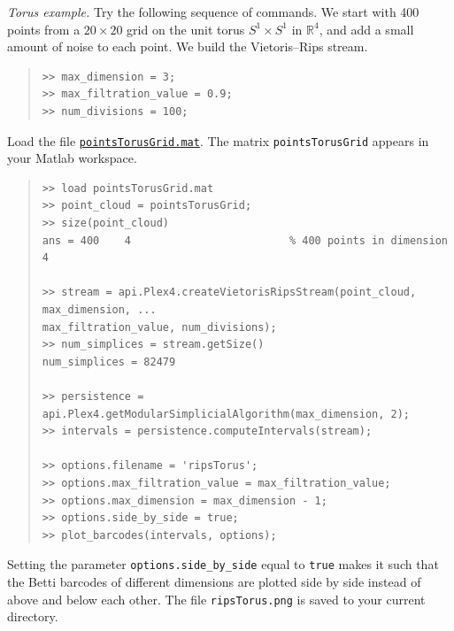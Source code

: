 \documentclass[amscd, amssymb, verbatim]{amsart}[12pt]
\theoremstyle{remark}
\theoremstyle{remark}
\theoremstyle{remark}
\begin{document}


{\em Torus example.} Try the following sequence of commands. We start with 400 points from a $20 \times 20$ grid on the unit torus $S^1 \times S^1$ in $\mathbb{R}^4$, and add a small amount of noise to each point.
We build the Vietoris--Rips stream.

\begin{quote} \begin{verbatim}
>> max_dimension = 3;
>> max_filtration_value = 0.9;
>> num_divisions = 100;
\end{verbatim} \end{quote}

Load the file \href{https://github.com/appliedtopology/javaplex/tree/master/src/matlab/for_distribution/tutorial_examples/pointsTorusGrid.mat}{\texttt{pointsTorusGrid.mat}}. The matrix \texttt{pointsTorusGrid} appears in your Matlab workspace.

\begin{quote} \begin{verbatim}
>> load pointsTorusGrid.mat
>> point_cloud = pointsTorusGrid;
>> size(point_cloud)
ans = 400    4                         % 400 points in dimension 4

>> stream = api.Plex4.createVietorisRipsStream(point_cloud, max_dimension, ...
max_filtration_value, num_divisions); 
>> num_simplices = stream.getSize()
num_simplices = 82479

>> persistence = api.Plex4.getModularSimplicialAlgorithm(max_dimension, 2);
>> intervals = persistence.computeIntervals(stream);

>> options.filename = 'ripsTorus';
>> options.max_filtration_value = max_filtration_value;
>> options.max_dimension = max_dimension - 1;
>> options.side_by_side = true;
>> plot_barcodes(intervals, options);
\end{verbatim} \end{quote}

Setting the parameter \texttt{options.side\_by\_side} equal to \texttt{true} makes it such that the Betti barcodes of different dimensions are plotted side by side instead of above and below each other. The file \texttt{ripsTorus.png} is saved to your current directory.
\end{document}
